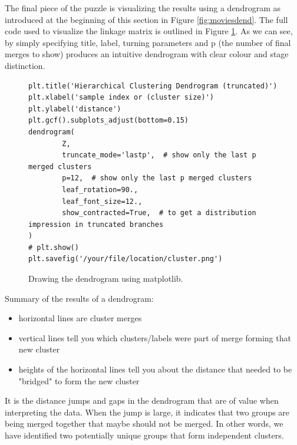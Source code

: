 \documentclass[msc,oneside]{ubcthesis}%
\begin{document}
The final piece of the puzzle is visualizing the results using a dendrogram as introduced at the beginning of this section in Figure \ref{fig:moviesdend}. The full code used to visualize the linkage matrix is outlined in Figure \ref{fig:matplotlibdend}. As we can see, by simply specifying title, label, turning parameters and p (the number of final merges to show) produces an intuitive dendrogram with clear colour and stage distinction.

\begin{figure}[H]
\begin{lstlisting}
plt.title('Hierarchical Clustering Dendrogram (truncated)')
plt.xlabel('sample index or (cluster size)')
plt.ylabel('distance')
plt.gcf().subplots_adjust(bottom=0.15)
dendrogram(
        Z,
        truncate_mode='lastp',  # show only the last p merged clusters
        p=12,  # show only the last p merged clusters
        leaf_rotation=90.,
        leaf_font_size=12.,
        show_contracted=True,  # to get a distribution impression in truncated branches
)
# plt.show()
plt.savefig('/your/file/location/cluster.png')
\end{lstlisting}
\caption[Drawing the dendrogram using matplotlib]{
Drawing the dendrogram using matplotlib.}
\label{fig:matplotlibdend}
\end{figure}

Summary of the results of a dendrogram:
\begin{itemize}
\item{horizontal lines are cluster merges}
\item{vertical lines tell you which clusters/labels were part of merge forming that new cluster}
\item{heights of the horizontal lines tell you about the distance that needed to be "bridged" to form the new cluster}
\end{itemize}
It is the distance jumps and gaps in the dendrogram that are of value when interpreting the data. When the jump is large, it indicates that two groups are being merged together that maybe should not be merged. In other words, we have identified two potentially unique groups that form independent clusters.
\end{document}
